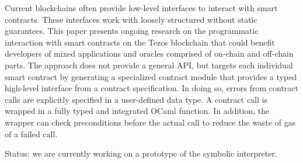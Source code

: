 \documentclass[a4paper,USenglish,american,cleveref, autoref, thm-restate]{oasics-v2021}
\begin{document}
Current blockchains often provide low-level interfaces to interact
with smart contracts. These interfaces work with loosely structured
without static guarantees. This paper presents ongoing research on the
programmatic interaction with smart contracts on the Tezos blockchain
that could benefit developers of mixed applications and
oracles comprised of on-chain and off-chain parts. The approach does
not provide a general API, but targets each 
individual smart contract by generating a specialized contract module
that provides a typed high-level interface from a contract
specification. In doing so, errors from contract calls are explicitly
specified in a user-defined data type. A contract call is wrapped in a
fully typed and integrated OCaml function. In addition, the wrapper can check preconditions before the 
actual call to reduce the waste of gas of a failed call.

Status: we are currently working on a prototype of the symbolic interpreter.






\end{document}
